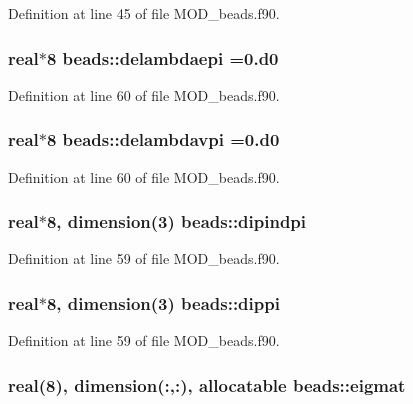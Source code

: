 Definition at line 45 of file M\-O\-D\-\_\-beads.\-f90.

\hypertarget{classbeads_a5c71ffc8c3220de7714385d1e40b5842}{
\subsubsection[{delambdaepi}]{\setlength{\rightskip}{0pt plus 5cm}real$\ast$8 beads\-::delambdaepi =0.d0}}\label{classbeads_a5c71ffc8c3220de7714385d1e40b5842}


Definition at line 60 of file M\-O\-D\-\_\-beads.\-f90.

\hypertarget{classbeads_ac3035b58557831f8b99b5790841f66ba}{
\subsubsection[{delambdavpi}]{\setlength{\rightskip}{0pt plus 5cm}real$\ast$8 beads\-::delambdavpi =0.d0}}\label{classbeads_ac3035b58557831f8b99b5790841f66ba}


Definition at line 60 of file M\-O\-D\-\_\-beads.\-f90.

\hypertarget{classbeads_a4766861f20d2423d705ad485ab88d60a}{
\subsubsection[{dipindpi}]{\setlength{\rightskip}{0pt plus 5cm}real$\ast$8, dimension(3) beads\-::dipindpi}}\label{classbeads_a4766861f20d2423d705ad485ab88d60a}


Definition at line 59 of file M\-O\-D\-\_\-beads.\-f90.

\hypertarget{classbeads_a8724cd55cbbb19fd54e4794fc1d99690}{
\subsubsection[{dippi}]{\setlength{\rightskip}{0pt plus 5cm}real$\ast$8, dimension(3) beads\-::dippi}}\label{classbeads_a8724cd55cbbb19fd54e4794fc1d99690}


Definition at line 59 of file M\-O\-D\-\_\-beads.\-f90.

\hypertarget{classbeads_a1a1ae0b7a858c5d1568204d3c7db7980}{
\subsubsection[{eigmat}]{\setlength{\rightskip}{0pt plus 5cm}real(8), dimension(\-:,\-:), allocatable beads\-::eigmat}}\label{classbeads_a1a1ae0b7a858c5d1568204d3c7db7980}


